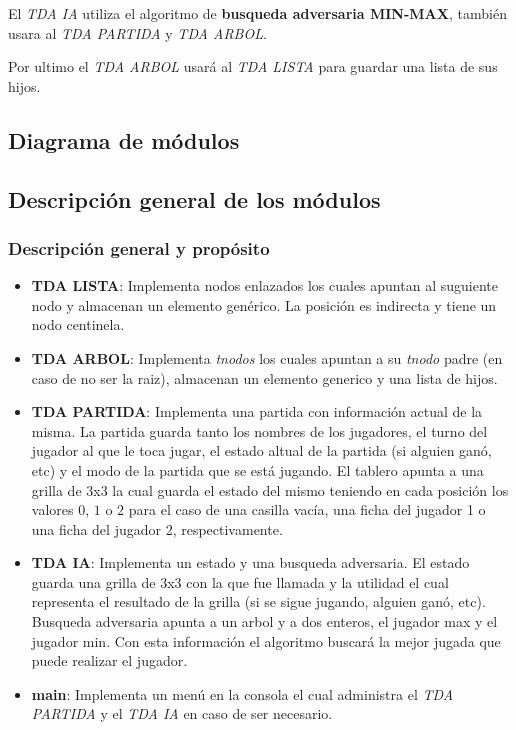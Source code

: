 \documentclass[12pt,a4paper]{article}
\begin{document}
    El {\itshape TDA IA} utiliza el algoritmo de {\bf busqueda adversaria MIN-MAX}, tambi\'en usara al {\itshape TDA PARTIDA} y {\itshape TDA ARBOL}.

    Por ultimo el {\itshape TDA ARBOL} usar\'a al {\itshape TDA LISTA} para guardar una lista de sus hijos.

\subsection{Diagrama de m\'odulos}

\subsection{Descripci\'on general de los m\'odulos}
\subsubsection{Descripci\'on general y prop\'osito}
\begin{itemize}
    \item {\bf TDA LISTA}: Implementa nodos enlazados los cuales apuntan al suguiente nodo y almacenan un elemento gen\'erico. La posici\'on es indirecta y tiene un nodo centinela.
	\item {\bf TDA ARBOL}: Implementa \emph{tnodos} los cuales apuntan a su \emph{tnodo} padre (en caso de no ser la raiz), almacenan un elemento generico y una lista de hijos.
    \item {\bf TDA PARTIDA}: Implementa una partida con informaci\'on actual de la misma. La partida guarda tanto los nombres de los jugadores, el turno del jugador al que le toca jugar, el estado altual de la partida (si alguien gan\'o, etc) y el modo de la partida que se est\'a jugando. El tablero apunta a una grilla de 3x3 la cual guarda el estado del mismo teniendo en cada posici\'on los valores $0$, $1$ o $2$ para el caso de una casilla vac\'ia, una ficha del jugador 1 o una ficha del jugador 2, respectivamente.
    \item {\bf TDA IA}: Implementa un estado y una busqueda adversaria. El estado guarda una grilla de 3x3 con la que fue llamada y la utilidad el cual representa el resultado de la grilla (si se sigue jugando, alguien gan\'o, etc). Busqueda adversaria apunta a un arbol y a dos enteros, el jugador max y el jugador min. Con esta informaci\'on el algoritmo buscar\'a la mejor jugada que puede realizar el jugador.
    \item {\bf main}: Implementa un men\'u en la consola el cual administra el {\itshape TDA PARTIDA} y el {\itshape TDA IA} en caso de ser necesario.
\end{itemize}
\end{document}
